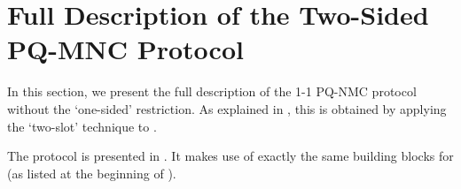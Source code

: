 
\section{Full Description of the Two-Sided PQ-MNC Protocol}
\label{sec:two-sided:full}

In this section, we present the full description of the 1-1 PQ-NMC protocol without the `one-sided' restriction. As explained in , this is obtained by applying the \cite{STOC:PasRos05} `two-slot' technique to . 


The protocol is presented in . It makes use of exactly the same building blocks for  (as listed at the beginning of ).

